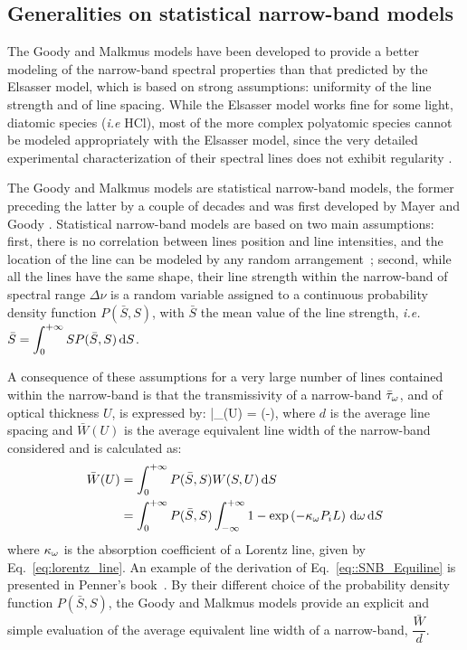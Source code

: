 \subsection{Generalities on statistical narrow-band models}
The Goody and Malkmus models have been developed to provide a better modeling of the narrow-band spectral properties than that predicted by the Elsasser model, which is based on strong assumptions: uniformity of the line strength and of line spacing. While the Elsasser model works fine for some light, diatomic  species (\textit{i.e} HCl), most of the more complex polyatomic species cannot be modeled appropriately with the Elsasser model, since the very detailed experimental characterization of their spectral lines does not exhibit regularity \cite{Modest2013}.

The Goody and Malkmus models are statistical narrow-band models, the former preceding the latter by a couple of decades and was first developed by Mayer and Goody \cite{Penner1959}. Statistical narrow-band models are based on two main assumptions: first, there is no correlation between lines position and line intensities, and the location of the line can be modeled by any random arrangement~\cite{Penner1959,Young1977d}; second, while all the lines have the same shape, their line strength within the narrow-band of spectral range $\Delta \nu$ is a random variable assigned to a continuous probability density function $P(\bar{S},S)$, with $\bar{S}$ the mean value of the line strength, \textit{i.e.} $\bar{S} = \displaystyle\int_{0}^{+\infty}{S P(\bar{S},S)\,\mathrm{d} S}$.

A consequence of these assumptions for a very large number of lines contained within the narrow-band is that the transmissivity of a narrow-band $\bar{\tau}_{\omega}$, and of optical thickness $U$, is expressed by:
\be\label{eq:SNB_tau_equiline}
\bar{\tau}_{\om}(U) = \exp\left(-\displaystyle{}\right),
\ee
where $d$ is the average line spacing and $\bar{W}(U)$ is the average equivalent line width of the narrow-band considered and is calculated as:
\begin{align}\label{eq::SNB_Equiline}
\bar{W}(U) &= \displaystyle\int_{0}^{+\infty}{P(\bar{S},S)W(S,U) \,\mathrm{d} S} \nonumber \\
           &= \displaystyle\int_{0}^{+\infty}{P(\bar{S},S)\displaystyle\int_{-\infty}^{+\infty}{1 - \exp\left(-\kappa_{\omega} P_i L\right) \,\mathrm{d}\omega} \,\mathrm{d} S}
\end{align}
where $\kappa_{\omega}$ is the absorption coefficient of a Lorentz line, given by Eq.~\ref{eq:lorentz_line}. An example of the derivation of Eq.~\ref{eq::SNB_Equiline} is presented in Penner's book~\cite{Penner1959}. By their different choice of the probability density function $P(\bar{S},S)$, the Goody and Malkmus models provide an explicit and simple evaluation of the average equivalent line width of a narrow-band, $\dfrac{\bar{W}}{d}$.


